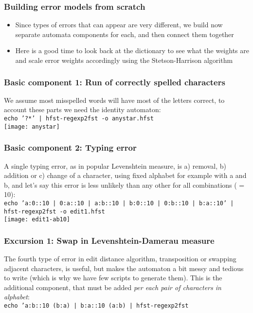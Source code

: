 \documentclass[t,12pt]{beamer}
\begin{document}
\begin{frame}
   \frametitle{Building error models from scratch}
   \begin{itemize}
       \item Since types of errors that can appear are very different, we
           build now separate automata components for each, and then
           connect them together
       \item Here is a good time to look back at the dictionary to see what
           the weights are and scale error weights accordingly using
           the Stetson-Harrison algorithm
   \end{itemize}
\end{frame}

\begin{frame}
    \frametitle{Basic component 1: Run of correctly spelled characters}
    We assume most misspelled words will have most of the letters correct,
    to account these parts we need the identity automaton:\\
    \texttt{echo '?*' | hfst-regexp2fst -o anystar.hfst}\\
    \texttt{[image: anystar]}
\end{frame}

\begin{frame}
    \frametitle{Basic component 2: Typing error}
    A single typing error, as in popular Levenshtein measure, is
    a) removal, b) addition or c) change of a character, using fixed alphabet
    for example with a and b, and let's say this error is less unlikely than
    any other for all combinations ( = 10):\\
    \texttt{echo 'a:0::10 | 0:a::10 | a:b::10 | b:0::10 | 0:b::10 | b:a::10' | hfst-regexp2fst -o edit1.hfst}\\
    \texttt{[image: edit1-ab10]}
\end{frame}

\begin{frame}
    \frametitle{Excursion 1: Swap in Levenshtein-Damerau measure}
    The fourth type of error in edit distance algorithm, transposition or
    swapping adjacent characters, is useful, but makes the automaton a bit messy
    and tedious to write (which is why we have few scripts to generate them).
    This is the additional component, that must be added \emph{per each pair of
    characters in alphabet}:\\
    \texttt{echo 'a:b::10 (b:a) | b:a::10 (a:b) | hfst-regexp2fst}\\
\end{frame}
\end{document}
